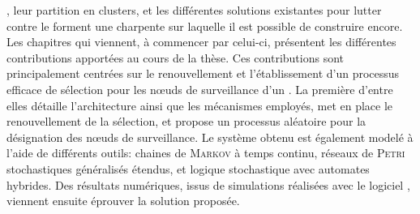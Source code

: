 \vfil
{}, leur partition en clusters, et les différentes solutions existantes pour lutter contre le \dds forment une charpente sur laquelle il est possible de construire encore.
Les chapitres qui viennent, à commencer par celui-ci, présentent les différentes contributions apportées au cours de la thèse.
Ces contributions sont principalement centrées sur le renouvellement et l'établissement d'un processus efficace de sélection pour les nœuds de surveillance d'un \rcs.
La première d'entre elles détaille l'architecture ainsi que les mécanismes employés, met en place le renouvellement de la sélection, et propose un processus aléatoire pour la désignation des nœuds de surveillance.
Le système obtenu est également modelé à l'aide de différents outils: chaines de \textsc{Markov} à temps continu, réseaux de \textsc{Petri} stochastiques généralisés étendus, et logique stochastique avec automates hybrides.
Des résultats numériques, issus de simulations réalisées avec le logiciel \nsii, viennent ensuite éprouver la solution proposée.
\vfil
